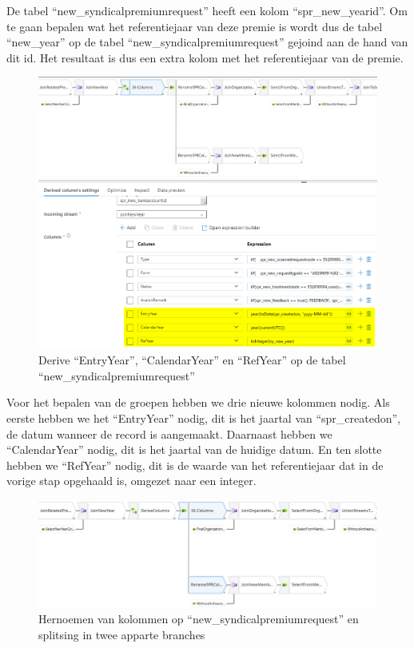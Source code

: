 De tabel ``new\_syndicalpremiumrequest'' heeft een kolom ``spr\_new\_yearid''. Om te gaan bepalen wat het referentiejaar van deze premie is wordt dus de tabel ``new\_year'' op de tabel ``new\_syndicalpremiumrequest'' gejoind aan de hand van dit id. Het resultaat is dus een extra kolom met het referentiejaar van de premie.


\begin{figure}[H]
    \centering
    \includegraphics[width=1\textwidth]{./graphics/adf/bepalen_groep_2.png}
    \caption{Derive ``EntryYear'', ``CalendarYear'' en ``RefYear'' op de tabel ``new\_syndicalpremiumrequest''}
\end{figure}

Voor het bepalen van de groepen hebben we drie nieuwe kolommen nodig. Als eerste hebben we het ``EntryYear'' nodig, dit is het jaartal van ``spr\_createdon'', de datum wanneer de record is aangemaakt. Daarnaast hebben we ``CalendarYear'' nodig, dit is het jaartal van de huidige datum. En ten slotte hebben we ``RefYear'' nodig, dit is de waarde van het referentiejaar dat in de vorige stap opgehaald is, omgezet naar een integer.

\begin{figure}[H]
    \centering
    \includegraphics[width=1\textwidth]{./graphics/adf/bepalen_groep_3.png}
    \caption{Hernoemen van kolommen op ``new\_syndicalpremiumrequest'' en splitsing in twee apparte branches}
\end{figure}

